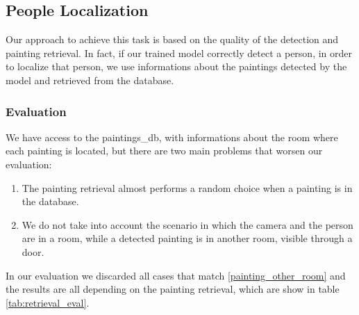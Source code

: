 \subsection{People Localization}
Our approach to achieve this task is based on the quality of the detection and painting retrieval. In fact, if our trained model correctly detect a person, in order to localize that person, we use informations about the paintings detected by the model and retrieved from the database.

\subsubsection{Evaluation}
We have access to the paintings\_db, with informations about the room where each painting is located, but there are two main problems that worsen our evaluation:

\begin{enumerate}[label=\alph*)]
	\item \label{retrieval_case} The painting retrieval almost performs a random choice when a painting is in the database.
    \item \label{painting_other_room} We do not take into account the scenario in which the camera and the person are in a room, while a detected painting is in another room, visible through a door.
\end{enumerate}

In our evaluation we discarded all cases that match \ref*{painting_other_room} and the results are all depending on the painting retrieval, which are show in table \ref*{tab:retrieval_eval}.
